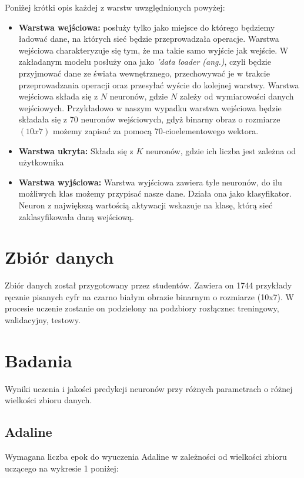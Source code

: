 \documentclass{article}
\begin{document}
	Poniżej krótki opis każdej z warstw uwzględnionych powyżej:
	\begin{itemize}
		\item \textbf{Warstwa wejściowa:} posłuży tylko jako miejsce do którego będziemy ładować dane, na których sieć będzie przeprowadzała operacje. Warstwa wejściowa charakteryzuje się tym, że ma takie samo wyjście jak wejście. W zakładanym modelu posłuży ona jako \textit{'data loader (ang.)}, czyli będzie przyjmować dane ze świata wewnętrznego, przechowywać je w trakcie przeprowadzania operacji oraz przesyłać wyście do kolejnej warstwy. Warstwa wejściowa składa się z $N$ neuronów, gdzie $N$ zależy od wymiarowości danych wejściowych. Przykładowo w naszym wypadku warstwa wejściowa będzie składała się z 70 neuronów wejściowych, gdyż binarny obraz o rozmiarze $(10x7)$ możemy zapisać za pomocą 70-cioelementowego wektora. 
		
	\item \textbf{Warstwa ukryta:} Składa się z $K$ neuronów, gdzie ich liczba jest zależna od użytkownika 
	
	\item \textbf{Warstwa wyjściowa: }Warstwa wyjściowa zawiera tyle neuronów, do ilu możliwych klas możemy przypisać nasze dane. Działa ona jako klasyfikator. Neuron z największą wartością aktywacji wskazuje na klasę, którą sieć zaklasyfikowała daną wejściową. 
	\end{itemize}
	
    
    \newpage
	\section{Zbiór danych}
	Zbiór danych został przygotowany przez studentów. Zawiera on 1744 przykłady ręcznie pisanych cyfr na czarno białym obrazie binarnym o rozmiarze (10x7). W procesie uczenie zostanie on podzielony na podzbiory rozłączne: treningowy, walidacyjny, testowy.
	
	\newpage
	\section{Badania}
	Wyniki uczenia i jakości predykcji neuronów przy różnych parametrach o różnej wielkości zbioru danych.
	\subsection{Adaline}
	    Wymagana liczba epok do wyuczenia Adaline w zależności od wielkości zbioru uczącego na wykresie 1 poniżej:
	    
\end{document}
